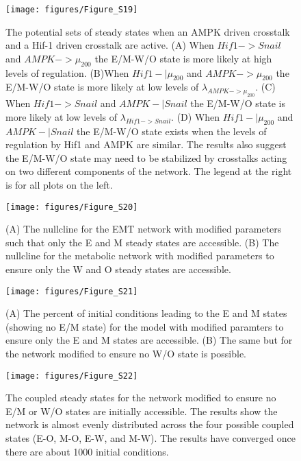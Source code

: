 \documentclass{article}
\begin{document}
\begin{figure}
\texttt{[image: figures/Figure\_S19]}
\caption{The potential sets of steady states when an AMPK driven crosstalk and a Hif-1 driven crosstalk are active. (A) When $Hif1 -> Snail$ and $AMPK -> \mu_{200}$ the E/M-W/O state is more likely at high levels of regulation. (B)When $Hif1 -| \mu_{200}$ and $AMPK -> \mu_{200}$ the E/M-W/O state is more likely at low levels of $\lambda_{AMPK->\mu_{200}}$. (C) When $Hif1 -> Snail$ and $AMPK -| Snail$ the E/M-W/O state is more likely at low  levels of $\lambda_{Hif1-> Snail}$. (D) When $Hif1 -| \mu_{200}$ and $AMPK -| Snail$ the E/M-W/O state exists when the levels of regulation by Hif1 and AMPK are similar. The results also suggest the E/M-W/O state may need to be stabilized by crosstalks acting on two different components of the network.  The legend at the right is for all plots on the left. }
\end{figure}


\begin{figure}
\texttt{[image: figures/Figure\_S20]}
\caption{(A) The nullcline for the EMT network with modified parameters such that only the E and M steady states are accessible. (B) The nullcline for the metabolic network with modified parameters to ensure only the W and O steady states are accessible. }
\end{figure}

\begin{figure}
\texttt{[image: figures/Figure\_S21]}
\caption{(A) The percent of initial conditions leading to the E and M states (showing no E/M state) for the model with modified paramters to ensure only the E and M states are accessible. (B) The same but for the network modified to ensure no W/O state is possible.}
\end{figure}

\begin{figure}
\texttt{[image: figures/Figure\_S22]}
\caption{The coupled steady states for the network modified to ensure no E/M or W/O states are initially accessible. The results show the network is almost evenly distributed across the four possible coupled states (E-O, M-O, E-W, and M-W).  The results have converged once there are about 1000 initial conditions. }
\end{figure}
\end{document}
